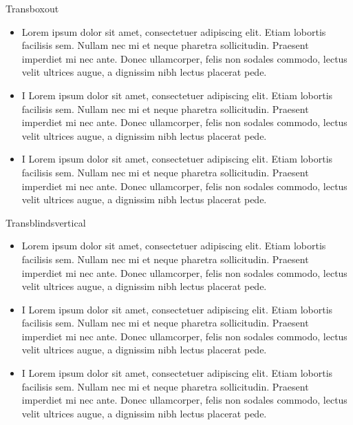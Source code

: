 \documentclass[10pt,xcolor=x11names]{beamer}
\begin{document}
\begin{frame}[c]{Transboxout} \vspace{0pt}

\begin{itemize}
	\item<1-> Lorem ipsum dolor sit amet, consectetuer adipiscing elit. Etiam lobortis facilisis sem. Nullam nec mi et neque pharetra sollicitudin. Praesent imperdiet mi nec ante. Donec ullamcorper, felis non sodales commodo, lectus velit ultrices augue, a dignissim nibh lectus placerat pede.
	\item<2-> I Lorem ipsum dolor sit amet, consectetuer adipiscing elit. Etiam lobortis
	facilisis sem. Nullam nec mi et neque pharetra sollicitudin. Praesent
	imperdiet mi nec ante. Donec ullamcorper, felis non sodales commodo, lectus
	velit ultrices augue, a dignissim nibh lectus placerat pede.
	\item<3-> I Lorem ipsum dolor sit amet, consectetuer adipiscing elit. Etiam lobortis
	facilisis sem. Nullam nec mi et neque pharetra sollicitudin. Praesent
	imperdiet mi nec ante. Donec ullamcorper, felis non sodales commodo, lectus
	velit ultrices augue, a dignissim nibh lectus placerat pede.
\end{itemize}

\end{frame}

\begin{frame}[c]{Transblindsvertical} \vspace{0pt}

\begin{itemize}
	\item<1-> Lorem ipsum dolor sit amet, consectetuer adipiscing elit. Etiam lobortis facilisis sem. Nullam nec mi et neque pharetra sollicitudin. Praesent imperdiet mi nec ante. Donec ullamcorper, felis non sodales commodo, lectus velit ultrices augue, a dignissim nibh lectus placerat pede.
	\item<2-> I Lorem ipsum dolor sit amet, consectetuer adipiscing elit. Etiam lobortis
	facilisis sem. Nullam nec mi et neque pharetra sollicitudin. Praesent
	imperdiet mi nec ante. Donec ullamcorper, felis non sodales commodo, lectus
	velit ultrices augue, a dignissim nibh lectus placerat pede.
	\item<3-> I Lorem ipsum dolor sit amet, consectetuer adipiscing elit. Etiam lobortis
	facilisis sem. Nullam nec mi et neque pharetra sollicitudin. Praesent
	imperdiet mi nec ante. Donec ullamcorper, felis non sodales commodo, lectus
	velit ultrices augue, a dignissim nibh lectus placerat pede.
\end{itemize}

\end{frame}
\end{document}
